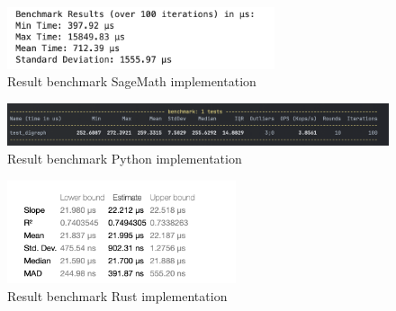 \begin{figure}[!h]
    \centering
    \includegraphics[width=0.70\textwidth]{images/benchmark/digraph/benchmark_digraph_sagemath}
    \caption{Result benchmark SageMath implementation}
    \label{fig:benchmark-digraph-sagemath}
\end{figure}

\begin{figure}[!h]
    \centering
    \includegraphics[width=1\textwidth]{images/benchmark/digraph/benchmark_digraph_python}
    \caption{Result benchmark Python implementation}
    \label{fig:benchmark-digraph-python}
\end{figure}

\begin{figure}[!h]
    \centering
    \includegraphics[width=0.60\textwidth]{images/benchmark/digraph/benchmark_digraph_rust}
    \caption{Result benchmark Rust implementation}
    \label{fig:benchmark-digraph-rust}
\end{figure}

